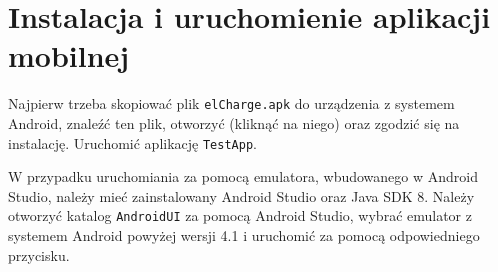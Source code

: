 \section{Instalacja i uruchomienie aplikacji mobilnej}
Najpierw trzeba skopiować plik \texttt{elCharge.apk} do urządzenia z systemem Android, znaleźć ten plik, otworzyć (kliknąć na niego) oraz zgodzić się na instalację.
Uruchomić aplikację \texttt{TestApp}.

W przypadku uruchomiania za pomocą emulatora, wbudowanego w Android Studio, należy mieć zainstalowany Android Studio oraz Java SDK 8.
Należy otworzyć katalog \texttt{AndroidUI} za pomocą Android Studio, wybrać emulator z systemem Android powyżej wersji 4.1 i uruchomić za pomocą odpowiedniego przycisku.
